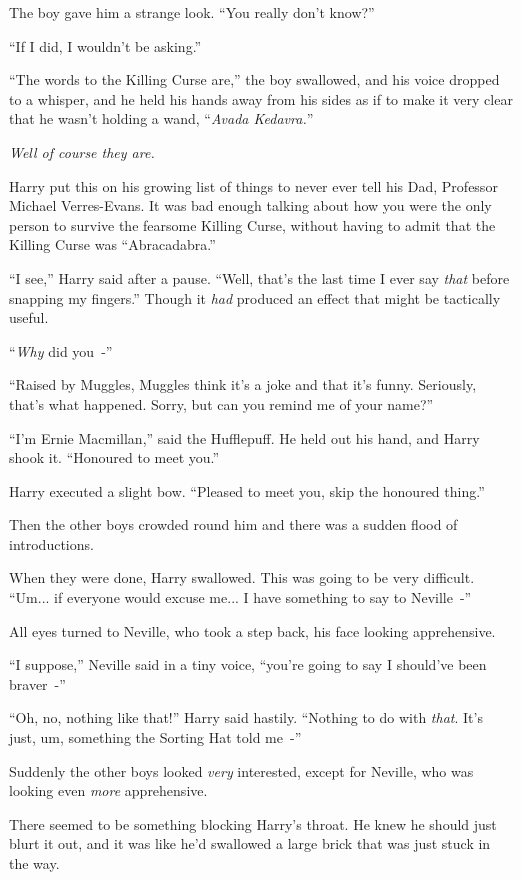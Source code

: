 The boy gave him a strange look. ``You really don't know?''

``If I did, I wouldn't be asking.''

``The words to the Killing Curse are,'' the boy swallowed, and his voice dropped to a whisper, and he held his hands away from his sides as if to make it very clear that he wasn't holding a wand, ``\emph{Avada Kedavra.}''

\emph{Well of course they are.}

Harry put this on his growing list of things to never ever tell his Dad, Professor Michael Verres-Evans. It was bad enough talking about how you were the only person to survive the fearsome Killing Curse, without having to admit that the Killing Curse was ``Abracadabra.''

``I see,'' Harry said after a pause. ``Well, that's the last time I ever say \emph{that} before snapping my fingers.'' Though it \emph{had} produced an effect that might be tactically useful.

``\emph{Why} did you~-''

``Raised by Muggles, Muggles think it's a joke and that it's funny. Seriously, that's what happened. Sorry, but can you remind me of your name?''

``I'm Ernie Macmillan,'' said the Hufflepuff. He held out his hand, and Harry shook it. ``Honoured to meet you.''

Harry executed a slight bow. ``Pleased to meet you, skip the honoured thing.''

Then the other boys crowded round him and there was a sudden flood of introductions.

When they were done, Harry swallowed. This was going to be very difficult. ``Um... if everyone would excuse me... I have something to say to Neville~-''

All eyes turned to Neville, who took a step back, his face looking apprehensive.

``I suppose,'' Neville said in a tiny voice, ``you're going to say I should've been braver~-''

``Oh, no, nothing like that!'' Harry said hastily. ``Nothing to do with \emph{that}. It's just, um, something the Sorting Hat told me~-''

Suddenly the other boys looked \emph{very} interested, except for Neville, who was looking even \emph{more} apprehensive.

There seemed to be something blocking Harry's throat. He knew he should just blurt it out, and it was like he'd swallowed a large brick that was just stuck in the way.

